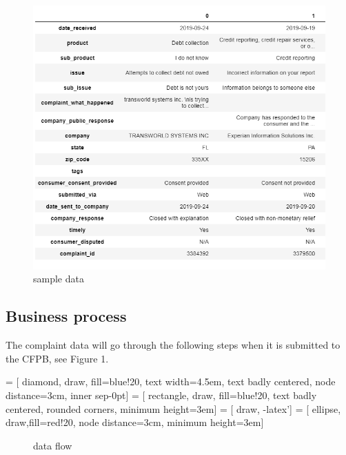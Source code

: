 \documentclass[conference]{IEEEtran}
\begin{document}
	\begin{figure}[h]
		\centering
		\includegraphics[width=1\linewidth]{img/data2rows.png}
\caption{sample data} \label{fig:sample data}
	\end{figure} 

\subsection{Business process}\label{AA}
The complaint data will go through the following steps when it is submitted to the CFPB, see Figure 1.

\usetikzlibrary{shapes.geometric,arrows}

 = [ diamond, draw, fill=blue!20, text width=4.5em, text badly centered, node distance=3cm, inner sep-0pt]  
 = [ rectangle, draw, fill=blue!20, text badly centered, rounded corners, minimum height=3em]  
 = [ draw, -latex']  
 = [ ellipse, draw,fill=red!20, node distance=3cm, minimum height=3em]  

\begin{figure}
\centering
{}
\caption{data flow} \label{fig:data flow}
\end{figure}
\end{document}
